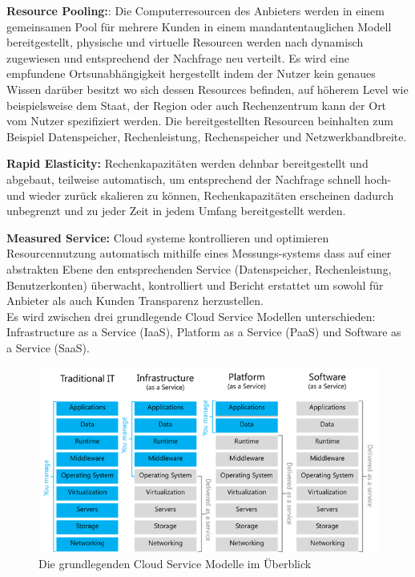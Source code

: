 \textbf{Resource Pooling:}: Die Computerresourcen des Anbieters werden in einem gemeinsamen Pool
für mehrere Kunden in einem mandantentauglichen Modell bereitgestellt, physische und
virtuelle Resourcen werden nach dynamisch zugewiesen und entsprechend der Nachfrage
neu verteilt. Es wird eine empfundene Ortsunabhängigkeit hergestellt indem der Nutzer
kein genaues Wissen darüber besitzt wo sich dessen Resources befinden, auf höherem
Level wie beispielsweise dem Staat, der Region oder auch Rechenzentrum kann
der Ort vom Nutzer spezifiziert werden. Die bereitgestellten Resourcen beinhalten
zum Beispiel Datenspeicher, Rechenleistung, Rechenspeicher und Netzwerkbandbreite.

\textbf{Rapid Elasticity:} Rechenkapazitäten werden dehnbar bereitgestellt und abgebaut,
teilweise automatisch, um entsprechend der Nachfrage schnell hoch- und wieder
zurück skalieren zu können, Rechenkapazitäten erscheinen dadurch unbegrenzt und
zu jeder Zeit in jedem Umfang bereitgestellt werden.

\textbf{Measured Service:} Cloud systeme kontrollieren und optimieren Resourcennutzung
automatisch mithilfe eines Messungs-systems dass auf einer abstrakten Ebene den
entsprechenden Service (Datenspeicher, Rechenleistung, Benutzerkonten) überwacht,
kontrolliert und Bericht erstattet um sowohl für Anbieter als auch Kunden Transparenz
herzustellen.\\

Es wird zwischen drei grundlegende Cloud Service Modellen unterschieden: Infrastructure
as a Service (IaaS), Platform as a Service (PaaS) und Software as a Service (SaaS).

\begin{figure}[H]
  \includegraphics[width=1.0\textwidth]{fig/hauptteil/Service-Models.png}
  \caption{Die grundlegenden Cloud Service Modelle im Überblick}
  \centering
\end{figure}


